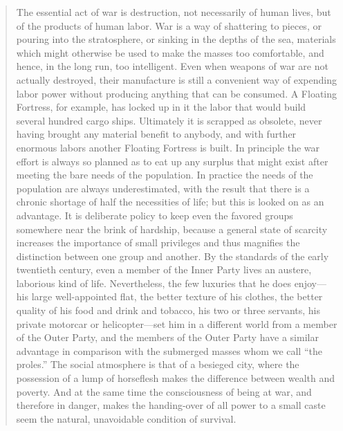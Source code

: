 \begin{quotation}
The essential act of war is destruction, not necessarily of human lives,
but of the products of human labor. War is a way of shattering to
pieces, or pouring into the stratosphere, or sinking in the depths of
the sea, materials which might otherwise be used to make the masses too
comfortable, and hence, in the long run, too intelligent. Even when
weapons of war are not actually destroyed, their manufacture is still a
convenient way of expending labor power without producing anything that
can be consumed. A Floating Fortress, for example, has locked up in it
the labor that would build several hundred cargo ships. Ultimately it is
scrapped as obsolete, never having brought any material benefit to
anybody, and with further enormous labors another Floating Fortress is
built. In principle the war effort is always so planned as to eat up any
surplus that might exist after meeting the bare needs of the population.
In practice the needs of the population are always underestimated, with
the result that there is a chronic shortage of half the necessities of
life; but this is looked on as an advantage. It is deliberate policy to
keep even the favored groups somewhere near the brink of hardship,
because a general state of scarcity increases the importance of small
privileges and thus magnifies the distinction between one group and
another. By the standards of the early twentieth century, even a member
of the Inner Party lives an austere, laborious kind of life.
Nevertheless, the few luxuries that he does enjoy---his large
well-appointed flat, the better texture of his clothes, the better
quality of his food and drink and tobacco, his two or three servants,
his private motorcar or helicopter---set him in a different world from a
member of the Outer Party, and the members of the Outer Party have a
similar advantage in comparison with the submerged masses whom we call
``the proles.'' The social atmosphere is that of a besieged city, where
the possession of a lump of horseflesh makes the difference between
wealth and poverty. And at the same time the consciousness of being at
war, and therefore in danger, makes the handing-over of all power to a
small caste seem the natural, unavoidable condition of survival.


\end{quotation}

